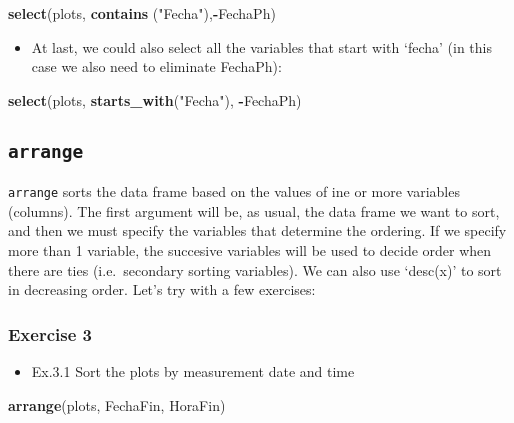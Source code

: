 \documentclass[]{article}
\newenvironment{Shaded}{\begin{snugshade}}{\end{snugshade}}
\newcommand{\KeywordTok}[1]{\textcolor[rgb]{0.13,0.29,0.53}{\textbf{#1}}}
\newcommand{\StringTok}[1]{\textcolor[rgb]{0.31,0.60,0.02}{#1}}
\newcommand{\OperatorTok}[1]{\textcolor[rgb]{0.81,0.36,0.00}{\textbf{#1}}}
\newcommand{\NormalTok}[1]{#1}
\providecommand{\tightlist}{%
  \setlength{\itemsep}{0pt}\setlength{\parskip}{0pt}}
\begin{document}
\begin{Shaded}
\begin{Highlighting}[]
\KeywordTok{select}\NormalTok{(plots, }\KeywordTok{contains}\NormalTok{ (}\StringTok{"Fecha"}\NormalTok{),}\OperatorTok{-}\NormalTok{FechaPh)}
\end{Highlighting}
\end{Shaded}

\begin{itemize}
\tightlist
\item
  At last, we could also select all the variables that start with
  `fecha' (in this case we also need to eliminate FechaPh):
\end{itemize}

\begin{Shaded}
\begin{Highlighting}[]
\KeywordTok{select}\NormalTok{(plots, }\KeywordTok{starts_with}\NormalTok{(}\StringTok{"Fecha"}\NormalTok{), }\OperatorTok{-}\NormalTok{FechaPh)}
\end{Highlighting}
\end{Shaded}

\subsection{\texorpdfstring{\texttt{arrange}}{arrange}}\label{arrange}

\texttt{arrange} sorts the data frame based on the values of ine or more
variables (columns). The first argument will be, as usual, the data
frame we want to sort, and then we must specify the variables that
determine the ordering. If we specify more than 1 variable, the
succesive variables will be used to decide order when there are ties
(i.e.~secondary sorting variables). We can also use `desc(x)' to sort in
decreasing order. Let's try with a few exercises:

\subsubsection{Exercise 3}\label{exercise-3}

\begin{itemize}
\tightlist
\item
  Ex.3.1 Sort the plots by measurement date and time
\end{itemize}

\begin{Shaded}
\begin{Highlighting}[]
\KeywordTok{arrange}\NormalTok{(plots, FechaFin, HoraFin)}
\end{Highlighting}
\end{Shaded}
\end{document}
